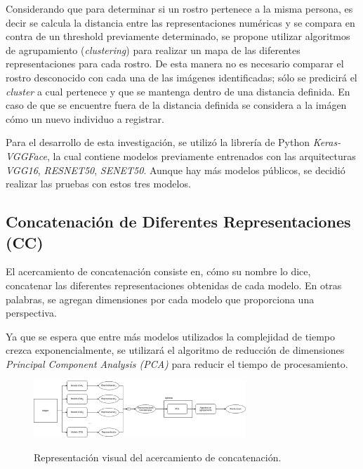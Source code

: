 \documentclass[letterpaper, 10 pt, conference]{ieeeconf}  %
\begin{document}
    Considerando que para determinar si un rostro pertenece a la misma persona, es decir se
    calcula la distancia entre las representaciones numéricas y se compara en contra de un
    threshold previamente determinado, se propone utilizar algoritmos de agrupamiento
    (\textit{clustering}) para realizar un mapa de las diferentes representaciones para cada
    rostro. De esta manera no es necesario comparar el rostro desconocido con cada una de las
    imágenes identificadas; sólo se predicirá el \textit{cluster} a cual pertenece y que se
    mantenga dentro de una distancia definida. En caso de que se encuentre fuera de la distancia
    definida se considera a la imágen cómo un nuevo individuo a registrar.

    Para el desarrollo de esta investigación, se utilizó la librería de Python
    \textit{Keras-VGGFace}, la cual contiene modelos previamente entrenados con las arquitecturas
    \textit{VGG16}, \textit{RESNET50}, \textit{SENET50}. Aunque hay más modelos públicos, se
    decidió realizar las pruebas con estos tres modelos.

    \subsection{Concatenación de Diferentes Representaciones (CC)}
    El acercamiento de concatenación consiste en, cómo su nombre lo dice, concatenar las
    diferentes representaciones obtenidas de cada modelo. En otras palabras, se agregan dimensiones
    por cada modelo que proporciona una perspectiva.
    
    Ya que se espera que entre más modelos utilizados la complejidad de tiempo crezca
    exponencialmente, se utilizará el algoritmo de reducción de dimensiones
    \textit{Principal Component Analysis (PCA)} para reducir el tiempo de procesamiento.

    \begin{figure}[ht]
        \centering
        \includegraphics[width=8cm]{./figs/cc.png}
        \label{fig: Concatenación}
        \caption{Representación visual del acercamiento de concatenación.}
    \end{figure}

\end{document}
